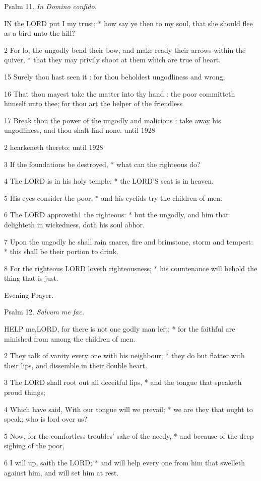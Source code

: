 Psalm
11. \emph{In Domino confido.}

IN
the LORD put I my trust; * how say ye then to my
soul, that she should flee as a bird unto the hill?

2 For lo, the ungodly bend their bow, and make ready
their arrows within the quiver, * that they may privily shoot at them
which are true of heart.

15 Surely thou hast seen it : for thou
beholdest ungodliness and wrong, 

16 That thou mayest take the matter into thy hand :
the poor committeth himself unto thee; for thou art the helper of the
friendless

17 Break thou the power of the ungodly and malicious
: take away his ungodliness, and thou shalt find none. until
1928

2 hearkeneth thereto; until
1928

3 If the foundations be destroyed, * what can the righteous
do?

4 The LORD is in his holy temple;
* the LORD’S seat is in heaven.

5 His eyes consider the poor, * and his eyelids try the
children of men.

6 The LORD approveth1
the righteous: * but the ungodly, and him that delighteth in wickedness,
doth his soul abhor.

7 Upon the ungodly he shall rain snares, fire and brimstone,
storm and tempest: * this shall be their portion to drink.

8 For the righteous LORD loveth
righteousness; * his countenance will behold the thing that is just.

Evening
Prayer.

Psalm
12. \emph{Salvum me fac.}

HELP
me,LORD, for there is not one godly man left; *
for the faithful are minished from among the children of men.

2 They talk of vanity every one with his neighbour; * they do but flatter
with their lips, and dissemble in their double heart.

3 The LORD shall root out all deceitful lips, *
and the tongue that speaketh proud things;

4 Which have said, With our tongue will we prevail; * we are they that
ought to speak; who is lord over us?

5 Now, for the comfortless troubles' sake of the needy, * and because
of the deep sighing of the poor,

6 I will up, saith the LORD; * and will help every
one from him that swelleth against him, and will set him at rest.

